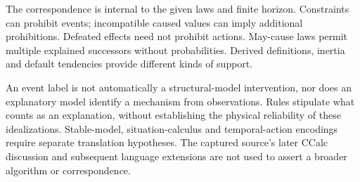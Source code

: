 The correspondence is internal to the given laws and finite horizon.
Constraints can prohibit events; incompatible caused values can imply
additional prohibitions. Defeated effects need not prohibit actions.
May-cause laws permit multiple explained successors without probabilities.
Derived definitions, inertia and default tendencies provide different
kinds of support.

An event label is not automatically a structural-model intervention,
nor does an explanatory model identify a mechanism from observations.
Rules stipulate what counts as an explanation, without establishing the
physical reliability of these idealizations. Stable-model,
situation-calculus and temporal-action encodings require separate
translation hypotheses. The captured source's later CCalc discussion
and subsequent language extensions are not used to assert a broader
algorithm or correspondence.
